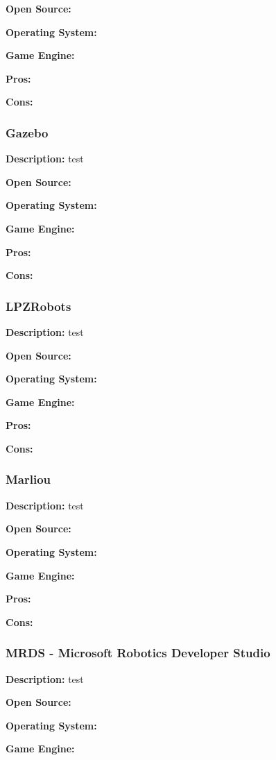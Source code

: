 \textbf{Open Source:}

\textbf{Operating System:}

\textbf{Game Engine:}

\textbf{Pros:}

\textbf{Cons:}


\subsubsection{Gazebo}
\textbf{Description:} test

\textbf{Open Source:}

\textbf{Operating System:}

\textbf{Game Engine:}

\textbf{Pros:}

\textbf{Cons:}


\subsubsection{LPZRobots}
\textbf{Description:} test

\textbf{Open Source:}

\textbf{Operating System:}

\textbf{Game Engine:}

\textbf{Pros:}

\textbf{Cons:}

\subsubsection{Marliou}
\textbf{Description:} test

\textbf{Open Source:}

\textbf{Operating System:}

\textbf{Game Engine:}

\textbf{Pros:}

\textbf{Cons:}

\subsubsection{MRDS - Microsoft Robotics Developer Studio}
\textbf{Description:} test

\textbf{Open Source:}

\textbf{Operating System:}

\textbf{Game Engine:}

